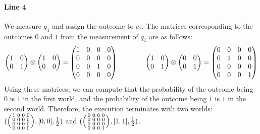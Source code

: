 \paragraph{Line 4}

We measure $q_1$ and assign the outcome to $c_1$.
%
The matrices corresponding to the outcomes $0$ and $1$ from the measurement of
$q_1$ are as follows:
%
\[
	\begin{pmatrix}1&0\\0&1\end{pmatrix}\otimes\begin{pmatrix}1&0\\0&0\end{pmatrix}
	=\begin{pmatrix}1&0&0&0\\0&0&0&0\\0&0&1&0\\0&0&0&0\end{pmatrix}
	\qquad\qquad
	\begin{pmatrix}1&0\\0&1\end{pmatrix}\otimes\begin{pmatrix}0&0\\0&1\end{pmatrix}
	=\begin{pmatrix}0&0&0&0\\0&1&0&0\\0&0&0&0\\0&0&0&1\end{pmatrix}
\]
%
Using these matrices, we can compute that the probability of the outcome being
$0$ is $1$ in the first world, and the probability of the outcome being $1$ is
$1$ in the second world.
%
Therefore, the execution terminates with two worlds:
%
$(\Big(\begin{smallmatrix}1&0&0&0\\0&0&0&0\\0&0&0&0\\0&0&0&0\end{smallmatrix}\Big),[0,0],\frac{1}{2})$ and
$(\Big(\begin{smallmatrix}0&0&0&0\\0&0&0&0\\0&0&0&0\\0&0&0&1\end{smallmatrix}\Big),[1,1],\frac{1}{2})$.